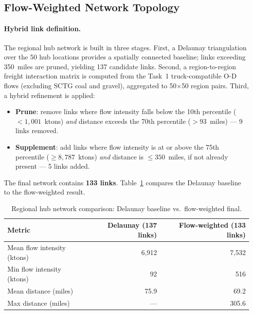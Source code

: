 \subsection{Flow-Weighted Network Topology}

\paragraph{Hybrid link definition.}
The regional hub network is built in three stages. First, a Delaunay triangulation over
the 50 hub locations provides a spatially connected baseline; links exceeding 350~miles
are pruned, yielding 137 candidate links. Second, a region-to-region freight interaction
matrix is computed from the Task~1 truck-compatible O-D flows (excluding SCTG coal and
gravel), aggregated to 50$\times$50 region pairs. Third, a hybrid refinement is applied:

\begin{itemize}
  \item \textbf{Prune}: remove links where flow intensity falls below the 10th percentile
        ($< 1{,}001$~ktons) \emph{and} distance exceeds the 70th percentile
        ($> 93$~miles) — 9 links removed.
  \item \textbf{Supplement}: add links where flow intensity is at or above the 75th
        percentile ($\geq 8{,}787$~ktons) \emph{and} distance is $\leq 350$~miles, if
        not already present — 5 links added.
\end{itemize}

The final network contains \textbf{133 links}. Table~\ref{tab:task5-network} compares
the Delaunay baseline to the flow-weighted result.

\begin{table}[H]
  \centering
  \caption{Regional hub network comparison: Delaunay baseline vs.\ flow-weighted final.}
  \label{tab:task5-network}
  \begin{tabular}{lrr}
    \toprule
    Metric & Delaunay (137 links) & Flow-weighted (133 links) \\
    \midrule
    Mean flow intensity (ktons) & 6{,}912 & 7{,}532 \\
    Min flow intensity (ktons) & \phantom{0,0}92 & \phantom{0,0}516 \\
    Mean distance (miles) & 75.9 & 69.2 \\
    Max distance (miles) & — & 305.6 \\
    \bottomrule
  \end{tabular}
\end{table}

